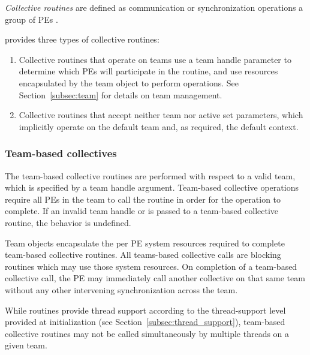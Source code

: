 \emph{Collective routines} are defined as  communication or synchronization
operations   a group of \acp{PE} .

{\color{Green}
\openshmem provides three types of collective routines:

\begin{enumerate}
\item Collective routines that operate on teams use a team handle parameter to determine
  which \acp{PE} will participate in the routine, and use resources encapsulated by the team object
  to perform operations. See Section~\ref{subsec:team} for details on team management.


\item Collective routines that accept neither team nor active set
  parameters, which implicitly operate on the default team and, as
  required, the default context.
\end{enumerate}

\subsubsection*{Team-based collectives}

The team-based collective routines are performed with respect to a valid
\openshmem team, which is specified by a team handle argument.
Team-based collective operations require all \acp{PE} in the team to call
the routine in order for the operation to complete. If an invalid team handle
or  is passed to a team-based collective
routine, the behavior is undefined.

Team objects encapsulate the per \ac{PE} system resources required to complete
team-based collective routines.
All \openshmem teams-based collective calls are blocking routines which may use those
system resources. On completion of a team-based collective call, the \ac{PE} may
immediately call another collective on that same team without any other intervening
synchronization across the team.

While \openshmem routines provide thread support according to the
thread-support level provided at initialization (see
Section~\ref{subsec:thread_support}), team-based collective routines
may not be called simultaneously by multiple threads on a given team.

}
